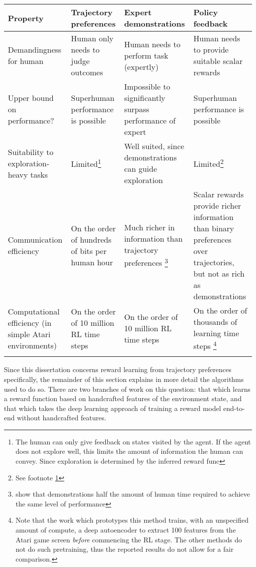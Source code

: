 \documentclass[11pt, a4paper, bibliography=totoc]{report}
\begin{document}
\small\singlespacing\RaggedLeft
\begin{tabularx}{\textwidth}{ 
		|X|X|X|X|
	}
	\hline 
\textbf{Property} & \textbf{Trajectory preferences} & \textbf{Expert demonstrations} & \textbf{Policy feedback} \\ 
\hline 
Demandingness for human & Human only needs to judge outcomes & Human needs to perform task (expertly) & Human needs to provide suitable scalar rewards \\ 
\hline 
Upper bound on performance? & Superhuman performance is possible & Impossible to significantly surpass performance of expert & Superhuman performance is possible \\ 
\hline 
Suitability to exploration-heavy tasks & Limited\footnote{\label{footnote:exploration}The human can only give feedback on states visited by the agent. If the agent does not explore well, this limits the amount of information the human can convey. Since exploration is determined by the inferred reward func } & Well suited, since demonstrations can guide exploration & Limited\footnote{See footnote \ref{footnote:exploration}} \\ 
\hline 
Communication efficiency & On the order of hundreds of bits per human hour & Much richer in information than trajectory preferences \footnote{\cite{Ibarz2018} show that demonstrations half the amount of human time required to achieve the same level of performance} & Scalar rewards provide richer information than binary preferences over trajectories, but not as rich as demonstrations \\ 
\hline 
Computational efficiency (in simple Atari environments) & On the order of 10 million RL time steps & On the order of 10 million RL time steps & On the order of thousands of learning time steps \footnote{Note that the work which prototypes this method trains, with an unspecified amount of compute, a deep autoencoder to extract 100 features from the Atari game screen \textit{before} commencing the RL stage. The other methods do not do such pretraining, thus the reported results do not allow for a fair comparison.} \\ 
\hline
\caption{Summary of the properties of using different forms of human feedback in RL without a reward function.} \label{table:1}
\end{tabularx}
\normalsize\doublespacing\justify

Since this dissertation concerns reward learning from trajectory preferences specifically, the remainder of this section explains in more detail the algorithms used to do so. There are two branches of work on this question: that which learns a reward function based on handcrafted features of the environment state, and that which takes the deep learning approach of training a reward model end-to-end without handcrafted features.
\end{document}
